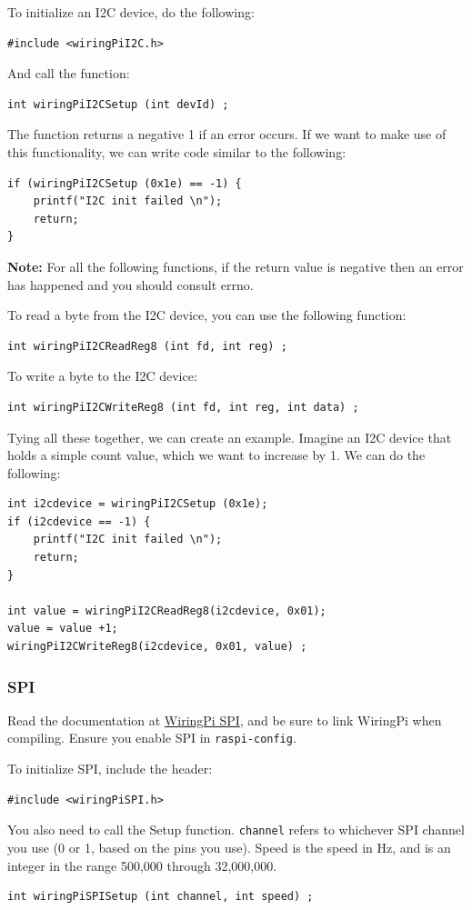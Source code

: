To initialize an I2C device, do the following:
\begin{lstlisting}
#include <wiringPiI2C.h>
\end{lstlisting}
And call the function:
\begin{lstlisting}
int wiringPiI2CSetup (int devId) ;
\end{lstlisting}
The function returns a negative 1 if an error occurs. If we want to make use of this functionality, we can write code similar to the following:
\begin{lstlisting}
if (wiringPiI2CSetup (0x1e) == -1) {
    printf("I2C init failed \n");
    return;
}
\end{lstlisting}

\textbf{Note:} For all the following functions, if the return value is negative then an error has happened and you should consult errno.

To read a byte from the I2C device, you can use the following function:
\begin{lstlisting}
int wiringPiI2CReadReg8 (int fd, int reg) ;
\end{lstlisting}

To write a byte to the I2C device:
\begin{lstlisting}
int wiringPiI2CWriteReg8 (int fd, int reg, int data) ;
\end{lstlisting}

Tying all these together, we can create an example. Imagine an I2C device that holds a simple count value, which we want to increase by 1. We can do the following:
\begin{lstlisting}
int i2cdevice = wiringPiI2CSetup (0x1e);
if (i2cdevice == -1) {
    printf("I2C init failed \n");
    return;
}

int value = wiringPiI2CReadReg8(i2cdevice, 0x01);
value = value +1;
wiringPiI2CWriteReg8(i2cdevice, 0x01, value) ;
\end{lstlisting}

\subsubsection{SPI}
Read the documentation at \href{http://wiringpi.com/reference/spi-library/}{WiringPi SPI}, and be sure to link WiringPi when compiling.
Ensure you enable SPI in \verb|raspi-config|. 

To initialize SPI, include the header:
\begin{lstlisting}
#include <wiringPiSPI.h>
\end{lstlisting}
You also need to call the Setup function. \verb|channel| refers to whichever SPI channel you use (0 or 1, based on the pins you use). Speed is the speed in Hz, and is an integer in the range 500,000 through 32,000,000.
\begin{lstlisting}
int wiringPiSPISetup (int channel, int speed) ;
\end{lstlisting}

